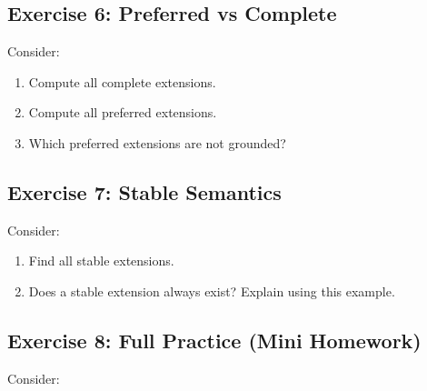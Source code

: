 \documentclass[11pt]{article}
\begin{document}
\subsection{Exercise 6: Preferred vs Complete}

Consider:

\begin{center}
\end{center}

\begin{enumerate}
    \item Compute all complete extensions.
    \item Compute all preferred extensions.
    \item Which preferred extensions are not grounded?
\end{enumerate}

\subsection{Exercise 7: Stable Semantics}

Consider:

\begin{center}
\end{center}

\begin{enumerate}
    \item Find all stable extensions.
    \item Does a stable extension always exist? Explain using this example.
\end{enumerate}

\subsection{Exercise 8: Full Practice (Mini Homework)}

Consider:
\end{document}
